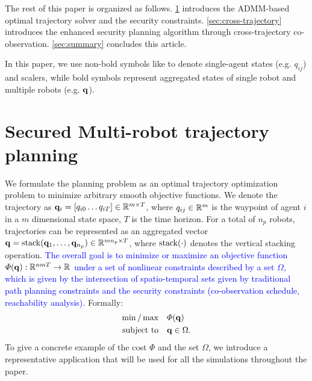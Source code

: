\documentclass[10pt,twocolumn,twoside]{IEEEtran}
\newcommand{\new}[1]{\textcolor{blue}{#1}}
\newcommand{\news}{\color{blue}}
\begin{document}
{\news The rest of this paper is organized as follows. \cref{sec:ADMM-planning} introduces the ADMM-based optimal trajectory solver and the security constraints. \cref{sec:cross-trajectory} introduces the enhanced security planning algorithm through cross-trajectory co-observation. \cref{sec:summary} concludes this article.

\noindent{} 
In this paper, we use non-bold symbols like to denote single-agent states (e.g. $q_{ij}$) and scalers, while bold symbols represent aggregated states of single robot and multiple robots (e.g. $\mathbf{q}$). }

\section{Secured Multi-robot trajectory planning}\label{sec:ADMM-planning}
We formulate the planning problem as an optimal trajectory optimization problem to minimize arbitrary smooth objective functions. {\news We denote the trajectory as $\mathbf{q}_i = [q_{i0}\dots q_{iT}]\in\mathbb{R}^{m\times T}{}$, where $q_{ij}\in\mathbb{R}^{m}{}$ is the waypoint of agent $i$ in a $m$ dimensional state space, $T$ is the time horizon. For a total of $n_p$ robots, trajectories can be represented as an aggregated vector $\mathbf{q} = \operatorname{stack}(\mathbf{q}_1,\dots,\mathbf{q}_{n_p})\in \mathbb{R}^{m n_p\times T}{}$, where $\operatorname{stack}(\cdot)$ denotes the vertical stacking operation. }
\new{The overall goal is to minimize or maximize an objective function $\varPhi(\mathbf{q}):\mathbb{R}^{n m T}{} \to \mathbb{R}^{}{}$ under a set of nonlinear constraints described by a set $\Omega$, which is given by the intersection of spatio-temporal sets given by traditional path planning constraints and the security constraints (co-observation schedule, reachability analysis).} Formally:
\begin{equation}\label{eq:general-problem}
	\begin{split}
		\min/\max & \quad \varPhi(\mathbf{q})\\
		\textrm{subject to} &\quad \mathbf{q} \in \Omega.
	\end{split}
\end{equation}
To give a concrete example of the cost $\varPhi$ and the set $\Omega$, we introduce a representative application that will be used for all the simulations throughout the paper.
\end{document}
